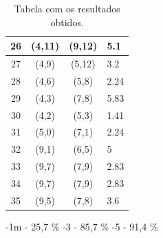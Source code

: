 \begin{table}[h]
{\begin{minipage}{\textwidth}
\begin{tabular}{| c | c | c | p{3cm} |}
	    26 & (4,11) & (9,12) & 5.1 \\ \hline
	    27 & (4,9) & (5,12) & 3.2 \\ \hline
	    28 & (4,6) & (5,8) & 2.24 \\ \hline
	    29 & (4,3) & (7,8) & 5.83 \\ \hline
	    30 & (4,2) & (5,3) & 1.41 \\ \hline
	    31 & (5,0) & (7,1) & 2.24 \\ \hline
	    32 & (9,1) & (6,5) & 5 \\ \hline
	    33 & (9,7) & (7,9) & 2.83 \\ \hline
	    34 & (9,7) & (7,9) & 2.83 \\ \hline 
	    35 & (9,5) & (7,8) & 3.6 \\ \hline 
	 \end{tabular}
	 \caption[Table caption text]{Tabela com os  resultados obtidos. }
	 \label{table:name}
	 
	\end{minipage} }
     \end{table}
     
    -1m - 25,7 \%
    -3 - 85,7 \%
    -5 - 91,4 \%

  
